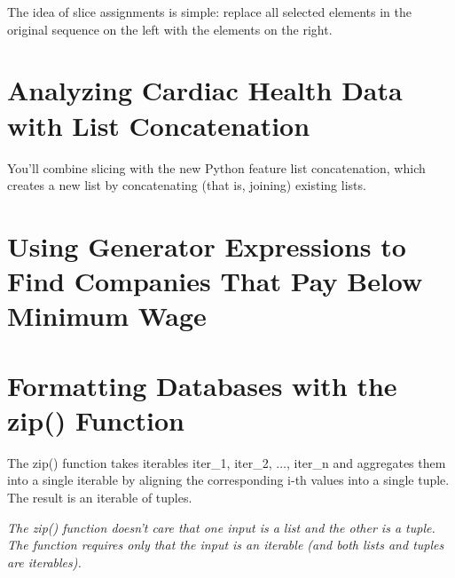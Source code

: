 The idea of slice assignments is simple: replace all selected elements in
the original sequence on the left with the elements on the right.

\section{Analyzing Cardiac Health Data with List Concatenation}
You'll combine slicing with the new Python feature list concatenation, which creates a new list by concatenating (that is, joining) existing lists.

\section{Using Generator Expressions to Find Companies That Pay Below Minimum Wage}
\section{Formatting Databases with the zip() Function}
The \textsf{zip()} function takes iterables iter\_1, iter\_2, $\dots$, iter\_n and aggregates them into a single iterable by aligning the corresponding i-th values into a single tuple. The result is an iterable of tuples.

\textit{The zip() function doesn't care that one input is a list and the other is a tuple. The function requires only that the input is an iterable (and both lists and tuples are iterables).}